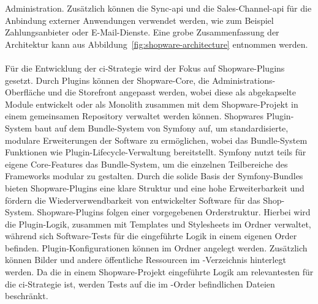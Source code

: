 Administration.
Zusätzlich können die Sync-\acrshort{api} und die Sales-Channel-\acrshort{api} für die Anbindung externer Anwendungen
verwendet werden, wie zum Beispiel Zahlungsanbieter oder E-Mail-Dienste.
Eine grobe Zusammenfassung der Architektur kann aus Abbildung\ \ref{fig:shopware-architecture} entnommen werden.
\\\\
Für die Entwicklung der \acrshort{ci}-Strategie wird der Fokus auf Shopware-Plugins gesetzt.
Durch Plugins können der Shopware-Core, die Administrations-Oberfläche und die Storefront angepasst werden, wobei diese
als abgekapselte Module entwickelt oder als Monolith zusammen mit dem Shopware-Projekt in einem gemeinsamen Repository
verwaltet werden können.
Shopwares Plugin-System baut auf dem Bundle-System von Symfony auf, um standardisierte, modulare Erweiterungen der
Software zu ermöglichen, wobei das Bundle-System Funktionen wie Plugin-Lifecycle-Verwaltung bereitstellt.
Symfony nutzt teils für eigene Core-Features das Bundle-System, um die einzelnen Teilbereiche des Frameworks modular zu
gestalten.
Durch die solide Basis der Symfony-Bundles bieten Shopware-Plugins eine klare Struktur und eine hohe Erweiterbarkeit
und fördern die Wiederverwendbarkeit von entwickelter Software für das Shop-System.
Shopware-Plugins folgen einer vorgegebenen Orderstruktur.
Hierbei wird die Plugin-Logik, zusammen mit Templates und Stylesheets im Ordner  verwaltet,
während sich Software-Tests für die eingeführte Logik in einem eigenen Order
 befinden.
Plugin-Konfigurationen können im Ordner  angelegt werden.
Zusätzlich können Bilder und andere öffentliche Ressourcen im -Verzeichnis hinterlegt werden.
Da die in einem Shopware-Projekt eingeführte Logik am relevantesten für die \acrshort{ci}-Strategie ist, werden Tests
auf die im -Order befindlichen Dateien beschränkt.

\clearpage

